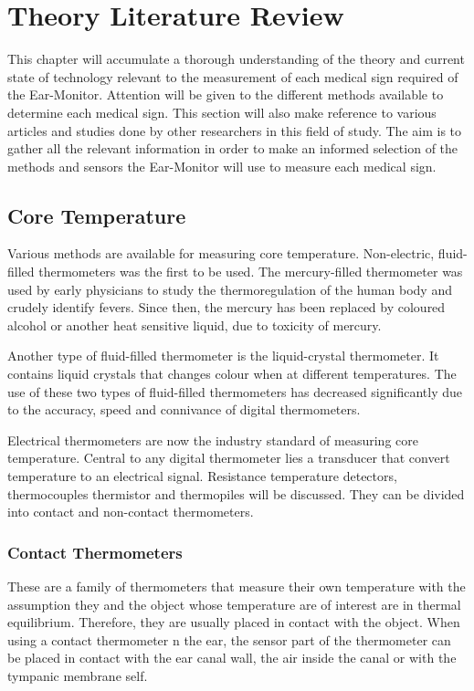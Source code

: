 \chapter{Theory Literature Review}
\label{chp:TheoryLit}
This chapter will accumulate a thorough understanding of the theory and current state of technology relevant to the measurement of each medical sign required of the Ear-Monitor. Attention will be given to the different methods available to determine each medical sign. This section will also make reference to various articles and studies done by other researchers in this field of study. The aim is to gather all the relevant information in order to make an informed selection of the methods and sensors the Ear-Monitor will use to measure each medical sign.

\section{Core Temperature}
Various methods are available for measuring core temperature. Non-electric, fluid-filled thermometers was the first to be used. The mercury-filled thermometer was used by early physicians to study the thermoregulation of the human body and crudely identify fevers. Since then, the mercury has been replaced by coloured alcohol or another heat sensitive liquid, due to toxicity of mercury.

\medskip

Another type of fluid-filled thermometer is the liquid-crystal thermometer. It contains liquid crystals that changes colour when at different temperatures. The use of these two types of fluid-filled thermometers has decreased significantly due to the accuracy, speed and connivance of digital thermometers.

\medskip

Electrical thermometers are now the industry standard of measuring core temperature. Central to any digital thermometer lies a transducer that convert temperature to an electrical signal. Resistance temperature detectors, thermocouples thermistor and thermopiles will be discussed. They can be divided into contact and non-contact thermometers.

\subsection{Contact Thermometers}
These are a family of thermometers that measure their own temperature with the assumption they and the object whose temperature are of interest are in thermal equilibrium. Therefore, they are usually placed in contact with the object. When using a contact thermometer n the ear, the sensor part of the thermometer can be placed in contact with the ear canal wall, the air inside the canal or with the tympanic membrane self.


